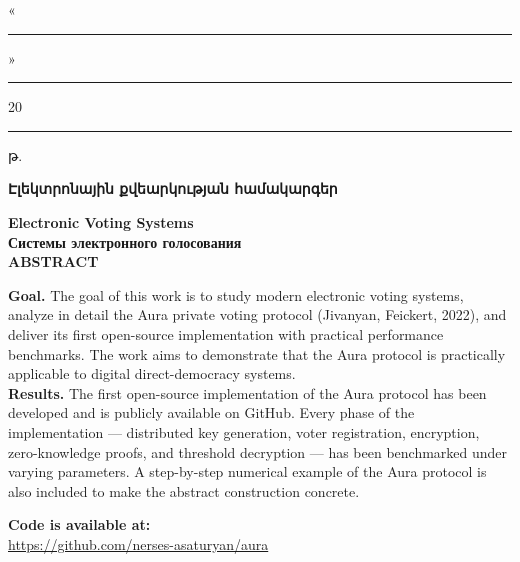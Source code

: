 \documentclass[12pt,a4paper,oneside]{report}
\begin{document}
\noindent\begin{armenian}«\rule{1cm}{0.4pt}»\rule{3cm}{0.4pt}20\rule{1cm}{0.4pt}թ.\end{armenian}
\newpage

\thispagestyle{empty}
\begin{center}
\begin{armenian}
{\large\textbf{Էլեկտրոնային քվեարկության համակարգեր}}\\[0.4cm]
\end{armenian}
{\large\textbf{Electronic Voting Systems}}\\[0.4cm]
{\large\textbf{Системы электронного голосования}}\\[1.2cm]

\textbf{ABSTRACT}
\end{center}
\vspace{0.4cm}

\noindent\textbf{Goal.} The goal of this work is to study modern electronic 
voting systems, analyze in detail the Aura private voting protocol 
(Jivanyan, Feickert, 2022), and deliver its first open-source 
implementation with practical performance benchmarks. The work aims 
to demonstrate that the Aura protocol is practically applicable to 
digital direct-democracy systems.\\[0.3cm]

\noindent\textbf{Results.} The first open-source implementation of the 
Aura protocol has been developed and is publicly available on GitHub. 
Every phase of the implementation --- distributed key generation, voter 
registration, encryption, zero-knowledge proofs, and threshold decryption 
--- has been benchmarked under varying parameters. A step-by-step 
numerical example of the Aura protocol is also included to make the 
abstract construction concrete.

\vspace{0.5cm}
\noindent\textbf{Code is available at:}\\
\url{https://github.com/nerses-asaturyan/aura}

\newpage

\setcounter{page}{4}
\tableofcontents
\newpage
\end{document}
